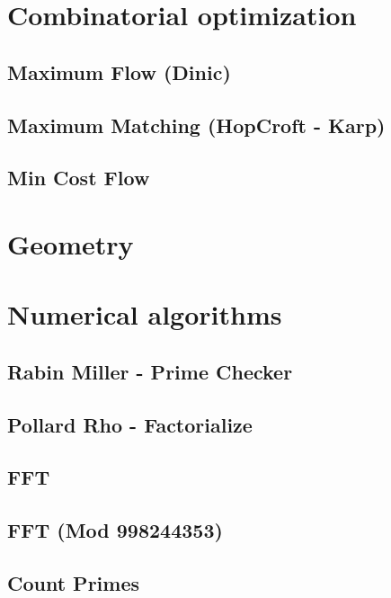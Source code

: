 \section{Combinatorial optimization}
\subsection{Maximum Flow (Dinic)}
\raggedbottom
\hrulefill
\subsection{Maximum Matching (HopCroft - Karp)}
\raggedbottom
\hrulefill
\subsection{Min Cost Flow}
\raggedbottom
\hrulefill

\section{Geometry}

\section{Numerical algorithms}
\subsection{Rabin Miller - Prime Checker}
\raggedbottom
\hrulefill
\subsection{Pollard Rho - Factorialize}
\raggedbottom
\hrulefill
\subsection{FFT}
\raggedbottom
\hrulefill
\subsection{FFT (Mod 998244353)}
\raggedbottom
\hrulefill
\subsection{Count Primes}
\raggedbottom
\hrulefill
